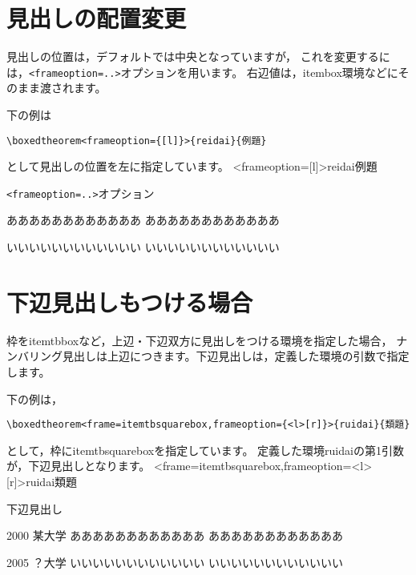 \documentclass[a4j]{jarticle}
\begin{document}
\section{見出しの配置変更}
見出しの位置は，デフォルトでは中央となっていますが，
これを変更するには，\texttt{<frameoption=..>}オプションを用います。
右辺値は，\textsf{itembox}環境などにそのまま渡されます。

下の例は
\begin{jquote}
\begin{verbatim}
\boxedtheorem<frameoption={[l]}>{reidai}{例題}
\end{verbatim}
\end{jquote}
として見出しの位置を左に指定しています。
\boxedtheorem<frameoption={[l]}>{reidai}{例題}

\begin{showEx}{\texttt{<frameoption=..>}オプション}
\begin{reidai}
ああああああああああああ
ああああああああああああ
\end{reidai}

\begin{reidai}
いいいいいいいいいいいい
いいいいいいいいいいいい
\end{reidai}
\end{showEx}

\section{下辺見出しもつける場合}
枠を\textsf{itemtbbox}など，上辺・下辺双方に見出しをつける環境を指定した場合，
ナンバリング見出しは上辺につきます。下辺見出しは，定義した環境の引数で指定します。

下の例は，
\begin{jquote}
\begin{verbatim}
\boxedtheorem<frame=itemtbsquarebox,frameoption={<l>[r]}>{ruidai}{類題}
\end{verbatim}
\end{jquote}
として，枠に\textsf{itemtbsquarebox}を指定しています。
定義した環境\textsf{ruidai}の第1引数が，下辺見出しとなります。
\boxedtheorem<frame=itemtbsquarebox,frameoption={<l>[r]}>{ruidai}{類題}

\begin{showEx}{下辺見出し}
\begin{ruidai}{2000 某大学}
ああああああああああああ
ああああああああああああ
\end{ruidai}

\begin{ruidai}{2005 ？大学}
いいいいいいいいいいいい
いいいいいいいいいいいい
\end{ruidai}
\end{showEx}
\end{document}
